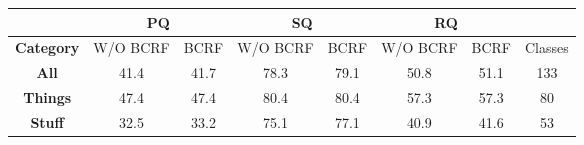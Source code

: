 \begin{table*}[t]
\vspace{-0.2cm}
\hspace{0.2cm}
\centering
{\arraybackslash
\begin{tabular}{c|c|c|c|c|c|c|c}
	\hline
	& \multicolumn{2}{c|}{\textbf{PQ}} & \multicolumn{2}{c|}{\textbf{SQ}} & \multicolumn{2}{c|}{\textbf{RQ}} &         \\ \hline
	\textbf{Category} & W/O BCRF          & BCRF         & W/O BCRF          & BCRF         & W/O BCRF          & BCRF         & Classes \\ \hline
	\textbf{All}      & 41.4              & 41.7         & 78.3              & 79.1         & 50.8              & 51.1         & 133     \\
	\textbf{Things}   & 47.4              & 47.4         & 80.4              & 80.4         & 57.3              & 57.3         & 80      \\
	\textbf{Stuff}    & 32.5              & 33.2         & 75.1              & 77.1         & 40.9              & 41.6         & 53      \\ \hline
\end{tabular}
}
\vspace{0.0cm}
\caption[Results on COCO dataset]{\label{tbl:coco_values}{\bf COCO dataset.} Panoptic segmentation results on the COCO validation set.}
\vspace{0.5cm}
\end{table*}


